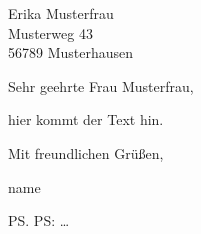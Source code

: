 \documentclass[%
  fontsize=12pt, %
  version=last%
]{scrlttr2}
\begin{document}
\begin{letter}{%
  Erika Musterfrau\\
  Musterweg 43\\
  56789 Musterhausen%
}




\opening{Sehr geehrte Frau Musterfrau,}

hier kommt der Text hin.

\closing{Mit freundlichen Grüßen,}

name

\ps PS: \dots



\end{letter}
\end{document}
